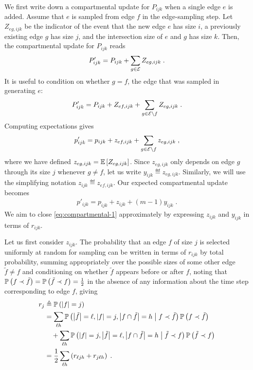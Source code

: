 We first write down a compartmental update for $P_{ijk}$ when a single edge $e$ is added. 
Assume that $e$ is sampled from edge $f$ in the edge-sampling step. 
Let $Z_{eg, ijk}$ be the indicator of the event that the new edge $e$ has size $i$, a previously existing edge $g$ has size $j$, and the intersection size of $e$ and $g$ has size $k$. 
Then, the compartmental update for $P_{ijk}$ reads
\begin{align}
    P'_{ijk} = P_{ijk} + \sum_{g \in \cE} Z_{eg, ijk}\;. 
\end{align}
It is useful to condition on whether $g = f$, the edge that was sampled in generating $e$: 
\begin{align}
    P'_{ijk} = P_{ijk} + Z_{ef, ijk} + \sum_{g \in \cE\setminus f} Z_{eg, ijk}\;. 
\end{align}
Computing expectations gives 
\begin{align}
    p'_{ijk} = p_{ijk} + z_{ef, ijk} + \sum_{g \in \cE\setminus f} z_{eg, ijk}\;, 
\end{align}
where we have defined $z_{eg, ijk} = \E{Z_{eg, ijk}}$.
Since $z_{eg, ijk}$ only depends on edge $g$ through its size $j$ whenever $g\neq f$, let us write $y_{ijk} \eqdef z_{eg, ijk}$. 
Similarly, we will use the simplifying notation $z_{ijk} \eqdef z_{ef,ijk}$. 
Our expected compartmental update becomes 
\begin{align}
    p'_{ijk} = p_{ijk} + z_{ijk} + (m-1) y_{ijk}\;. \label{eq:compartmental-1}
\end{align}
We aim to close \cref{eq:compartmental-1} approximately by expressing $z_{ijk}$ and $y_{ijk}$ in terms of $r_{ijk}$. 

Let us first consider $z_{ijk}$. 
The probability that an edge $f$ of size $j$ is selected uniformly at random for sampling can be written %
in terms of $r_{ijk}$ by total probability, summing appropriately over the possible sizes of some other edge $\tilde{f}\neq f$ and conditioning on whether $\tilde{f}$ appears before or after $f$, noting that $\prob{f \prec \tilde{f}} = \prob{\tilde{f} \prec f} = \frac{1}{2}$ in the absence of any information about the time step corresponding to edge $f$, giving
\begin{align}
    r_j &\eqdef \prob{\abs{f}=j} \\
    &= \sum_{\ell h} \prob{\abs{\tilde{f}} = \ell, \abs{f} = j, \abs{f\cap \tilde{f}} = h \given f \prec \tilde{f}} \prob{f \prec \tilde{f}} \\
    &\quad+ \sum_{\ell h}\prob{\abs{f} = j, \abs{\tilde{f}} = \ell, \abs{f\cap \tilde{f}} = h \given \tilde{f} \prec f} \prob{\tilde{f} \prec f} \\
    &= \frac{1}{2}\sum_{\ell h} \paren{r_{\ell jh } + r_{j \ell h }}\;.
\end{align}

